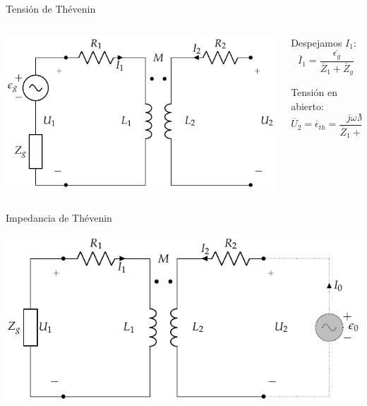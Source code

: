 \documentclass[aspectratio=169, usenames,svgnames,dvipsnames]{beamer}
\begin{document}
\begin{frame}[label={sec:org30a3888}]{Tensión de Thévenin}
\begin{columns}
\begin{column}{0.5\columnwidth}
\begin{center}
\includegraphics[height=0.5\textheight]{../figs/Trafo_Real_FuentePrimario.pdf}
\end{center}
\end{column}
\begin{column}{0.5\columnwidth}
Despejamos \(I_1\):
\[
  \overline{I}_1 = \frac{\overline{\epsilon_g}}{\overline{Z}_1 + \overline{Z}_g}
\]

Tensión en abierto:
\[
  \overline{U}_2 = \boxed{\overline{\epsilon}_{th} = \frac{j\omega M}{\overline{Z}_1 + \overline{Z}_g} \cdot \overline{\epsilon}_g}
\]
\end{column}
\end{columns}
\end{frame}
\begin{frame}[label={sec:org6f8834a}]{Impedancia de Thévenin}
\begin{center}
\includegraphics[width=.9\linewidth]{../figs/Trafo_Real_ImpedanciaPrimario.pdf}
\end{center}
\end{frame}
\end{document}
